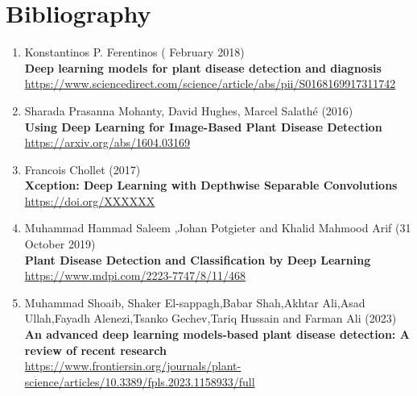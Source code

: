 \chapter{Bibliography}

\begin{enumerate}
    \item Konstantinos P. Ferentinos ( February 2018) \\
        \textbf{Deep learning models for plant disease detection and diagnosis} \\
        \href{https://www.sciencedirect.com/science/article/abs/pii/S0168169917311742}{https://www.sciencedirect.com/science/article/abs/pii/S0168169917311742} \\
        
    \item Sharada Prasanna Mohanty, David Hughes, Marcel Salathé (2016) \\
        \textbf{Using Deep Learning for Image-Based Plant Disease Detection} \\
        \href{https://arxiv.org/abs/1604.03169}{https://arxiv.org/abs/1604.03169} \\

    \item Francois Chollet (2017) \\
        \textbf{Xception: Deep Learning with Depthwise Separable Convolutions} \\
        \href{https://doi.org/XXXXXX}{https://doi.org/XXXXXX} \\

    \item Muhammad Hammad Saleem ,Johan Potgieter and Khalid Mahmood Arif (31 October 2019) \\
        \textbf{Plant Disease Detection and Classification by Deep Learning} \\
        \href{https://www.mdpi.com/2223-7747/8/11/468}{https://www.mdpi.com/2223-7747/8/11/468} \\

    \item Muhammad Shoaib, Shaker El-sappagh,Babar Shah,Akhtar Ali,Asad Ullah,Fayadh Alenezi,Tsanko Gechev,Tariq Hussain and Farman Ali (2023) \\
        \textbf{An advanced deep learning models-based plant disease detection: A review of recent research } \\
        \href{https://www.frontiersin.org/journals/plant-science/articles/10.3389/fpls.2023.1158933/full}{https://www.frontiersin.org/journals/plant-science/articles/10.3389/fpls.2023.1158933/full} \\


\end{enumerate}
